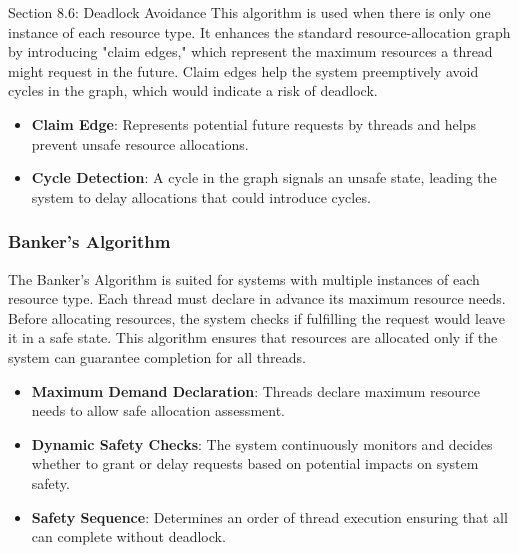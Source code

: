 \begin{notes}{Section 8.6: Deadlock Avoidance}
    This algorithm is used when there is only one instance of each resource type. It enhances the standard resource-allocation graph by introducing "claim edges," which represent the maximum resources 
    a thread might request in the future. Claim edges help the system preemptively avoid cycles in the graph, which would indicate a risk of deadlock.
    
    \begin{highlight}
    
        \begin{itemize}
            \item \textbf{Claim Edge}: Represents potential future requests by threads and helps prevent unsafe resource allocations.
            \item \textbf{Cycle Detection}: A cycle in the graph signals an unsafe state, leading the system to delay allocations that could introduce cycles.
        \end{itemize}
    
    \end{highlight}
    
    \subsubsection*{Banker's Algorithm}
    
    The Banker's Algorithm is suited for systems with multiple instances of each resource type. Each thread must declare in advance its maximum resource needs. Before allocating resources, the system 
    checks if fulfilling the request would leave it in a safe state. This algorithm ensures that resources are allocated only if the system can guarantee completion for all threads.
    
    \begin{highlight}
    
        \begin{itemize}
            \item \textbf{Maximum Demand Declaration}: Threads declare maximum resource needs to allow safe allocation assessment.
            \item \textbf{Dynamic Safety Checks}: The system continuously monitors and decides whether to grant or delay requests based on potential impacts on system safety.
            \item \textbf{Safety Sequence}: Determines an order of thread execution ensuring that all can complete without deadlock.
        \end{itemize}
    

\end{highlight}
\end{notes}
